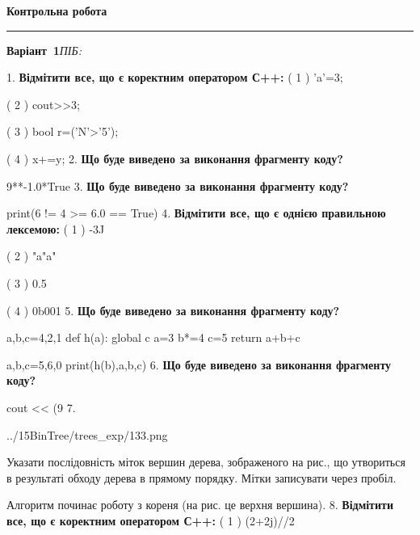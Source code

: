 \documentclass[11pt]{article}
\begin{document}
{\centering\Large\bfseries Контрольна робота\par}
\medskip
\noindent\rule{\linewidth}{0.5pt}
\smallskip
\noindent\textbf{Варіант \No\,1}\hfill \textit{ПІБ:}\,\underline{\hspace{60mm}}
\vspace{4mm}

1. %
\textbf{Відмітити все, що є коректним оператором С++:}
( 1 ) 'a'=3;

( 2 ) cout>>3;

( 3 ) bool r=('N'>'5');

( 4 ) x+=y;
\vspace{5mm}
2. \textbf{Що буде виведено за виконання фрагменту коду?}

9**-1.0*True
\vspace{5mm}
3. \textbf{Що буде виведено за виконання фрагменту коду?}

print(6 != 4 >= 6.0 == True)
\vspace{5mm}
4. %
\textbf{Відмітити все, що є однією правильною лексемою:}
( 1 ) -3J

( 2 ) "a"a"

( 3 ) 0.5

( 4 ) 0b001
\vspace{5mm}
5. \textbf{Що буде виведено за виконання фрагменту коду?}

a,b,c=4,2,1
def h(a):
global c    a=3
    b*=4
    c=5
    return a+b+c

a,b,c=5,6,0
print(h(b),a,b,c)
\vspace{5mm}
6. \textbf{Що буде виведено за виконання фрагменту коду?}

cout << (9 %
\vspace{5mm}
7. 

\begin{center}
	{../15BinTree/trees_exp/133.png}
\end{center}
Указати послідовність міток вершин дерева, зображеного на рис., що утвориться в результаті обходу дерева в прямому порядку. Мітки записувати через пробіл.\par Алгоритм починає роботу з кореня (на рис. це верхня вершина).
\vspace{5mm}
8. %
\textbf{Відмітити все, що є коректним оператором С++:}
( 1 ) (2+2j)//2
\end{document}
